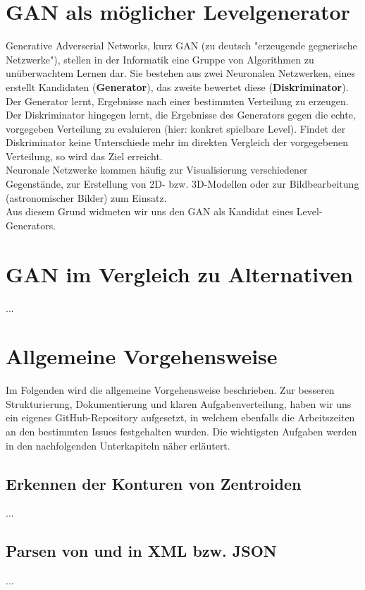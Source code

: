 \documentclass[11pt]{article}
\begin{document}
\section{GAN als möglicher Levelgenerator}
Generative Adverserial Networks, kurz GAN (zu deutsch "erzeugende gegnerische Netzwerke"), stellen in der Informatik eine Gruppe von Algorithmen zu unüberwachtem Lernen dar. Sie bestehen aus zwei Neuronalen Netzwerken, eines erstellt Kandidaten (\textbf{Generator}), das zweite bewertet diese (\textbf{Diskriminator}).\\Der Generator lernt, Ergebnisse nach einer bestimmten Verteilung zu erzeugen. Der Diskriminator hingegen lernt, die Ergebnisse des Generators gegen die echte, vorgegeben Verteilung zu evaluieren (hier: konkret spielbare Level). Findet der Diskriminator keine Unterschiede mehr im direkten Vergleich der vorgegebenen Verteilung, so wird das Ziel erreicht.\\Neuronale Netzwerke kommen häufig zur Visualisierung verschiedener Gegenstände, zur Erstellung von 2D- bzw. 3D-Modellen oder zur Bildbearbeitung (astronomischer Bilder) zum Einsatz.\\Aus diesem Grund widmeten wir uns den GAN als Kandidat eines Level-Generators.
\section{GAN im Vergleich zu Alternativen}
...
\section{Allgemeine Vorgehensweise}
Im Folgenden wird die allgemeine Vorgehensweise beschrieben. Zur besseren Strukturierung, Dokumentierung und klaren Aufgabenverteilung, haben wir uns ein eigenes GitHub-Repository aufgesetzt, in welchem ebenfalls die Arbeitszeiten an den bestimmten Issues festgehalten wurden. Die wichtigsten Aufgaben werden in den nachfolgenden Unterkapiteln näher erläutert.
\subsection{Erkennen der  Konturen von Zentroiden}
...
\subsection{Parsen von und in XML bzw. JSON}
...
\end{document}
